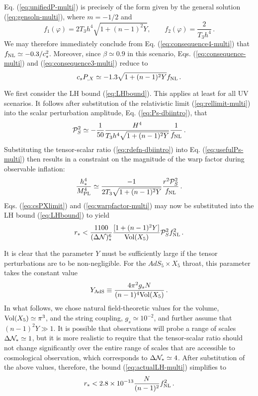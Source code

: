 Eq. (\ref{eq:unifiedP-multi}) is precisely of the form given by the 
general solution (\ref{eq:gensoln-multi}), where $m=-1/2$ and 
% 
\begin{equation}
\label{eq:fdefns-multi}
f_1 (\varphi) = 2T_3 h^4 \sqrt{1+(n-1)^2Y} , \qquad 
f_2 (\varphi) = \frac{2}{T_3 h^4} \,.
\end{equation}
% 
We may therefore immediately conclude from Eq. (\ref{eq:consequence4-multi}) that $f_{\mathrm{NL}}
\simeq -0.3/c_s^2$. Moreover, since $\beta \simeq 0.9$ in this scenario, 
Eqs. (\ref{eq:consequence-multi}) and (\ref{eq:consequence3-multi}) reduce to  
% 
\begin{equation}
\label{eq:csPXlimit}
c_sP_{,X} \simeq -1.3 \sqrt{1+(n-1)^2Y} f_{\mathrm{NL}} \,.
\end{equation}
% 


We first consider the LH bound (\ref{eq:LHbound}). This applies at least for all
UV scenarios. It follows after substitution of the relativistic limit
(\ref{eq:rellimit-multi}) into the scalar perturbation amplitude, Eq. (\ref{eq:Ps-dbiintro}),
that 
% 
\begin{equation}
\label{eq:usefulPs-multi}
\mathcal{P}_S^2 \simeq -\frac{1}{50} \frac{H^4}{T_3 h^4\sqrt{1+(n-1)^2Y}}
\frac{1}{f_{\mathrm{NL}}}\,.
\end{equation}
% 
Substituting the tensor-scalar ratio (\ref{eq:rdefn-dbiintro}) into  
Eq. (\ref{eq:usefulPs-multi}) then results in a constraint on the magnitude of 
the warp factor during observable inflation:
%  
\begin{equation}
\label{eq:warpfactor-multi}
\frac{h^4_*}{M_{\mathrm{PL}}^4} \simeq \frac{-1}{2 T_3 \sqrt{1+(n-1)^2Y}} 
\frac{r^2 \mathcal{P}_S^2}{f_{\mathrm{NL}}} \,.
\end{equation}
% 
Eqs. (\ref{eq:csPXlimit}) and (\ref{eq:warpfactor-multi}) may now be substituted into 
the LH bound (\ref{eq:LHbound}) to yield
%  
\begin{equation}
\label{eq:actualLH-multi}
r_* < \frac{1100}{(\Delta {\cal{N}} )_*^6} 
\frac{[1+(n-1)^2Y]}{\mathrm{Vol} (X_5)} \mathcal{P}_S^2 f_{\mathrm{NL}}^2 \,.
\end{equation}
% 


It is clear that the parameter $Y$ 
must be sufficiently large if the tensor perturbations 
are to be non-negligible. For the $AdS_5 \times X_5$ throat, this parameter  
takes the constant value    
% 
\begin{equation}
\label{eq:YAds-multi}
Y_{\mathrm{AdS}} \equiv \frac{4\pi^2 g_s N}{(n-1)^4 \mathrm{Vol} (X_5)} \,.
\end{equation}
% 
In what follows, we chose natural field-theoretic values for the volume, 
$\mathrm{Vol} (X_5) \simeq \pi^3$, and the string coupling, 
$g_s \simeq 10^{-2}$, and further assume that 
$(n-1)^2 Y \gg 1$. It is possible that observations will probe a 
range of scales $\Delta {\cal{N}}_* \simeq 1$, 
but it is more realistic to require that 
the tensor-scalar ratio should not change significantly over the 
entire range of scales that are accessible to cosmological observation,  
which corresponds to $\Delta {\cal{N}}_* \simeq 4$.
After substitution of the above values, therefore, 
the bound (\ref{eq:actualLH-multi}) simplifies to
%  
\begin{equation}
\label{eq:AdSupper-multi}
r_* < 2.8 \times 10^{-13} \frac{N}{(n-1)^2} f_{\mathrm{NL}}^2 \,.
\end{equation}
% 


